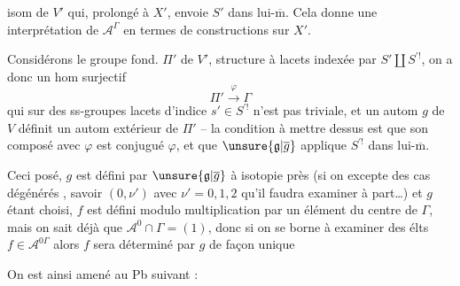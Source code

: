 
isom de $V'$ qui, prolongé à $X'$, envoie $S'$ dans lui-$\overline{\mathrm m}$. Cela donne une interprétation de $\mathcal A^\Gamma$ en termes de constructions sur $X'$.

Considérons le groupe fond. $\Pi'$ de $V'$,  structure à lacets indexée par $S'\amalg S^{\prime!}$, on a donc un hom surjectif
\[
\Pi'\xrightarrow{\varphi}\Gamma
\]
qui sur  des ss-groupes  lacets d'indice $s'\in S^{\prime!}$ n'est pas triviale, et un autom $g$ de $V$ définit un autom extérieur  de $\Pi'$ -- la condition à mettre dessus est que son composé avec $\varphi$ est conjugué  $\varphi$, et que $\unsure{\mathfrak g|\overline g}$ applique $S^{\prime!}$ dans lui-$\overline{\mathrm m}$.


Ceci posé,  $g$ est défini par $\unsure{\mathfrak g|\overline g}$ à isotopie près  (si on excepte des cas  dégénérés , savoir $(0,\nu')$ avec $\nu'=0,1,2$ qu'il faudra examiner à part\ldots) et $g$ étant choisi, $f$ est défini modulo multiplication par un élément du centre de $\Gamma$, mais on sait déjà que $\mathcal A^0\cap\Gamma=(1)$, donc si on se borne à examiner des élts $f\in\mathcal A^{0\Gamma}$ alors $f$ sera déterminé par $g$ de façon unique


On est ainsi amené au Pb suivant :

